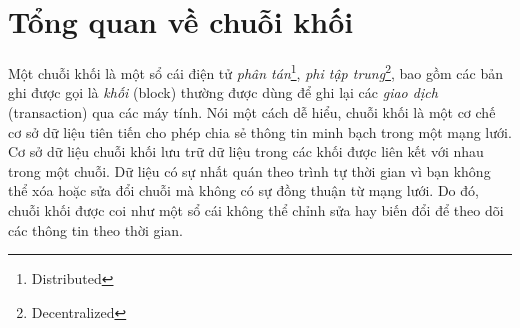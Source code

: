 \section{Tổng quan về chuỗi khối}

Một chuỗi khối là một sổ cái điện tử \textit{phân tán}\footnote{Distributed}, \textit{phi tập trung}\footnote{Decentralized}, bao gồm các bản ghi được gọi là \textit{khối} (block) thường được dùng để ghi lại các \textit{giao dịch} (transaction) qua các máy tính. Nói một cách dễ hiểu, chuỗi khối là một cơ chế cơ sở dữ liệu tiên tiến cho phép chia sẻ thông tin minh bạch trong một mạng lưới. Cơ sở dữ liệu chuỗi khối lưu trữ dữ liệu trong các khối được liên kết với nhau trong một chuỗi. Dữ liệu có sự nhất quán theo trình tự thời gian vì bạn không thể xóa hoặc sửa đổi chuỗi mà không có sự đồng thuận từ mạng lưới. Do đó, chuỗi khối được coi như một sổ cái không thể chỉnh sửa hay biến đổi để theo dõi các thông tin theo thời gian.
